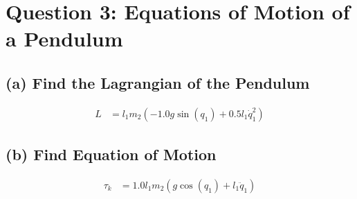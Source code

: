 \documentclass[10pt]{article}
\begin{document}
\section{Question 3: Equations of Motion of a Pendulum}
\subsection{(a) Find the Lagrangian of the Pendulum}
\begin{equation}
\begin{align}
L  &= l_{1} m_{2} \left(- 1.0 g \sin{\left (q_{1} \right )} + 0.5 l_{1} \dot{q}_{1}^{2}\right)
\end{align}
\end{equation}

\subsection{(b) Find Equation of Motion}
\begin{equation}
\begin{align}
\tau_{k} &= 1.0 l_{1} m_{2} \left(g \cos{\left (q_{1} \right )} + l_{1} \ddot{q}_{1}\right)
\end{align}
\end{equation}
\end{document}
